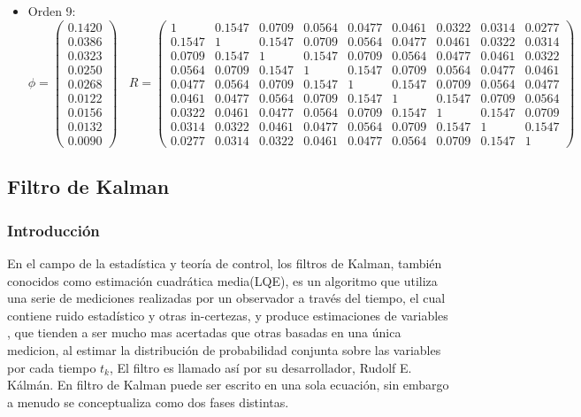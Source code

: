 \begin{itemize}
\item Orden 9:
\begin{equation*}
	\phi = 
	\begin{pmatrix}
		0.1420 \\
		0.0386 \\
		0.0323 \\
		0.0250 \\
		0.0268 \\
		0.0122 \\
		0.0156 \\
		0.0132 \\
		0.0090
	\end{pmatrix}	\	\	\	\
	R =
	\begin{pmatrix}	
	1 & 0.1547 & 0.0709 & 0.0564 & 0.0477 & 0.0461 & 0.0322 & 0.0314 & 0.0277 \\
	0.1547 & 1 & 0.1547 & 0.0709 & 0.0564 & 0.0477 & 0.0461 & 0.0322 & 0.0314 \\
	0.0709 & 0.1547 & 1 & 0.1547 & 0.0709 & 0.0564 & 0.0477 & 0.0461 & 0.0322 \\
	0.0564 & 0.0709 & 0.1547 & 1 & 0.1547 & 0.0709 & 0.0564 & 0.0477 & 0.0461 \\
	0.0477 & 0.0564 & 0.0709 & 0.1547 & 1 & 0.1547 & 0.0709 & 0.0564 & 0.0477 \\
	0.0461 & 0.0477 & 0.0564 & 0.0709 & 0.1547 & 1 & 0.1547 & 0.0709 & 0.0564 \\
	0.0322 & 0.0461 & 0.0477 & 0.0564 & 0.0709 & 0.1547 & 1 & 0.1547 & 0.0709 \\
	0.0314 & 0.0322 & 0.0461 & 0.0477 & 0.0564 & 0.0709 & 0.1547 & 1 & 0.1547 \\
	0.0277 & 0.0314 & 0.0322 & 0.0461 & 0.0477 & 0.0564 & 0.0709 & 0.1547 & 1	  
	\end{pmatrix}
\end{equation*}

\end{itemize}

\subsection{Filtro de Kalman}

\subsubsection{Introducción}
En el campo de la estadística y teoría de control, los filtros de Kalman, también conocidos como estimación cuadrática media(LQE), es un algoritmo que utiliza una serie de mediciones realizadas por un observador a través del tiempo, el cual contiene ruido estadístico y otras in-certezas, y  produce estimaciones de variables , que tienden a ser mucho mas acertadas que otras basadas en una única medicion, al estimar la distribución de probabilidad conjunta sobre las variables por cada tiempo $t_k$, El filtro es llamado así por su desarrollador, Rudolf E. Kálmán.
En filtro de Kalman puede ser escrito en una sola ecuación, sin embargo a menudo se conceptualiza como dos fases distintas.

